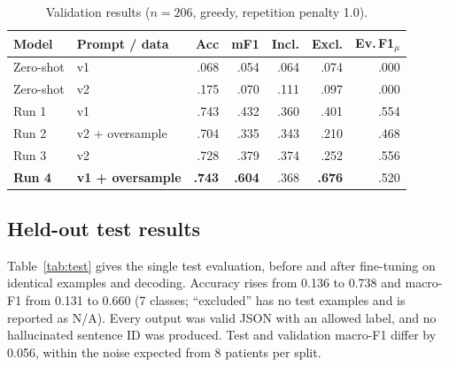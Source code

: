 \documentclass[conference]{IEEEtran}
\begin{document}
\begin{table}[t]
\centering
\caption{Validation results ($n{=}206$, greedy, repetition penalty 1.0).}
\label{tab:val}
\footnotesize
\setlength{\tabcolsep}{3.2pt}
\begin{tabular}{llrrrrr}
\toprule
Model & Prompt / data & Acc & mF1 & Incl. & Excl. & Ev.\,F1$_\mu$ \\
\midrule
Zero-shot & v1 & .068 & .054 & .064 & .074 & .000 \\
Zero-shot & v2 & .175 & .070 & .111 & .097 & .000 \\
Run 1 & v1 & .743 & .432 & .360 & .401 & .554 \\
Run 2 & v2 + oversample & .704 & .335 & .343 & .210 & .468 \\
Run 3 & v2 & .728 & .379 & .374 & .252 & .556 \\
\textbf{Run 4} & \textbf{v1 + oversample} & \textbf{.743} & \textbf{.604} & .368 & \textbf{.676} & .520 \\
\bottomrule
\end{tabular}
\end{table}

\subsection{Held-out test results}
Table~\ref{tab:test} gives the single test evaluation, before and after fine-tuning on identical examples and decoding. Accuracy rises from 0.136 to 0.738 and macro-F1 from 0.131 to 0.660 (7 classes; ``excluded'' has no test examples and is reported as N/A). Every output was valid JSON with an allowed label, and no hallucinated sentence ID was produced. Test and validation macro-F1 differ by 0.056, within the noise expected from 8 patients per split.

\begin{table}[t]
\centering
\caption{Test results ($n{=}206$, evaluated once). Per-class F1 (support) for the fine-tuned model.}
\label{tab:test}
\footnotesize
\setlength{\tabcolsep}{3.5pt}
\end{table}
\end{document}
